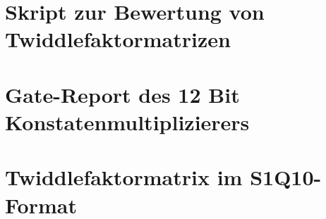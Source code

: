 \section{Skript zur Bewertung von Twiddlefaktormatrizen}
 
 
 \section{Gate-Report des 12 Bit Konstatenmultiplizierers}
 

 \section{Twiddlefaktormatrix im S1Q10-Format}
 
 
 
 
 
 
 

 
 
